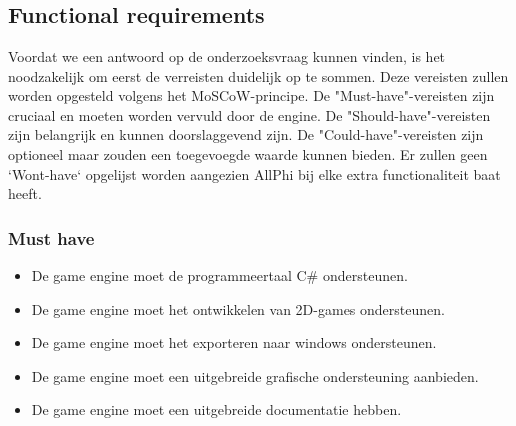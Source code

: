 
\chapter{}%
\label{ch:requirements-analyse}


\section{Functional requirements}
Voordat we een antwoord op de onderzoeksvraag kunnen vinden, is het noodzakelijk om eerst de verreisten duidelijk op te sommen. Deze vereisten zullen worden opgesteld volgens het MoSCoW-principe. De "Must-have"-vereisten zijn cruciaal en moeten worden vervuld door de engine. De "Should-have"-vereisten zijn belangrijk en kunnen doorslaggevend zijn. De "Could-have"-vereisten zijn optioneel maar zouden een toegevoegde waarde kunnen bieden. Er zullen geen `Wont-have` opgelijst worden aangezien AllPhi bij elke extra functionaliteit baat heeft.
\subsection{Must have}
\begin{itemize}
    \item De game engine moet de programmeertaal C\# ondersteunen.
    \item De game engine moet het ontwikkelen van 2D-games ondersteunen.
    \item De game engine moet het exporteren naar windows ondersteunen.
    \item De game engine moet een uitgebreide grafische ondersteuning aanbieden.
    \item De game engine moet een uitgebreide documentatie hebben.
\end{itemize}

